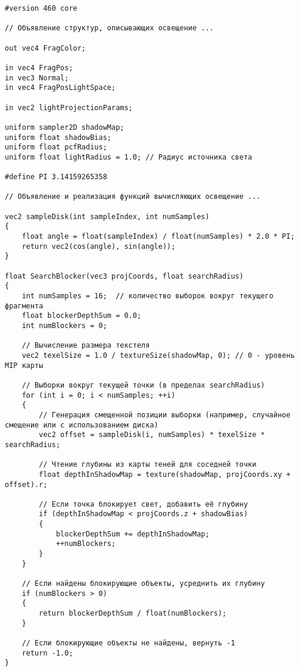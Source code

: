 \begin{center}
\captionsetup{justification=centering, singlelinecheck=off}
\begin{lstlisting}[label=lst:shadow_map_pcss_frag, caption=Фрагментный шейдер с учетом перспективного проецирония теней]
#version 460 core

// Объявление структур, описывающих освещение ...

out vec4 FragColor;

in vec4 FragPos;
in vec3 Normal;
in vec4 FragPosLightSpace;

in vec2 lightProjectionParams;

uniform sampler2D shadowMap;
uniform float shadowBias;
uniform float pcfRadius;
uniform float lightRadius = 1.0; // Радиус источника света

#define PI 3.14159265358

// Объявление и реализация функций вычисляющих освещение ...

vec2 sampleDisk(int sampleIndex, int numSamples)
{
    float angle = float(sampleIndex) / float(numSamples) * 2.0 * PI;
    return vec2(cos(angle), sin(angle));
}

float SearchBlocker(vec3 projCoords, float searchRadius)
{
    int numSamples = 16;  // количество выборок вокруг текущего фрагмента
    float blockerDepthSum = 0.0;
    int numBlockers = 0;

    // Вычисление размера текстеля
    vec2 texelSize = 1.0 / textureSize(shadowMap, 0); // 0 - уровень MIP карты

    // Выборки вокруг текущей точки (в пределах searchRadius)
    for (int i = 0; i < numSamples; ++i)
    {
        // Генерация смещенной позиции выборки (например, случайное смещение или с использованием диска)
        vec2 offset = sampleDisk(i, numSamples) * texelSize * searchRadius;

        // Чтение глубины из карты теней для соседней точки
        float depthInShadowMap = texture(shadowMap, projCoords.xy + offset).r;

        // Если точка блокирует свет, добавить её глубину
        if (depthInShadowMap < projCoords.z + shadowBias)
        {
            blockerDepthSum += depthInShadowMap;
            ++numBlockers;
        }
    }

    // Если найдены блокирующие объекты, усреднить их глубину
    if (numBlockers > 0)
    {
        return blockerDepthSum / float(numBlockers);
    }

    // Если блокирующие объекты не найдены, вернуть -1
    return -1.0;
}


\end{lstlisting}
\end{center}

